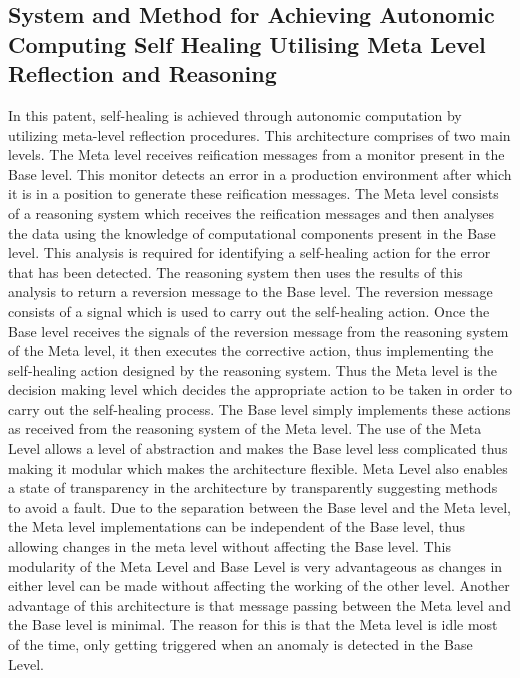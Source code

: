\documentclass[conference]{IEEEtran}
\begin{document}
\subsection{System and Method for Achieving Autonomic Computing Self Healing Utilising Meta Level Reflection and Reasoning}
In this patent, self-healing is achieved through autonomic computation by utilizing meta-level reflection procedures. This architecture comprises of two main levels. The Meta level receives reification messages from a monitor present in the Base level. This monitor detects an error in a production environment after which it is in a position to generate these reification messages.\cite{FELLENSTEIN:2007} The Meta level consists of a reasoning system which receives the reification messages and then analyses the data using the knowledge of computational components present in the Base level. This analysis is required for identifying a self-healing action for the error that has been detected. The reasoning system then uses the results of this analysis to return a reversion message to the Base level. The reversion message consists of a signal which is used to carry out the self-healing action. Once the Base level receives the signals of the reversion message from the reasoning system of the Meta level, it then executes the corrective action, thus implementing the self-healing action designed by the reasoning system. Thus the Meta level is the decision making level which decides the appropriate action to be taken in order to carry out the self-healing process. The Base level simply implements these actions as received from the reasoning system of the Meta level. The use of the Meta Level allows a level of abstraction and makes the Base level less complicated thus making it modular which makes the architecture flexible. Meta Level also enables a state of transparency in the architecture by transparently suggesting methods to avoid a fault. Due to the separation between the Base level and the Meta level, the Meta level implementations can be independent of the Base level, thus allowing changes in the meta level without affecting the Base level. This modularity of the Meta Level and Base Level is very advantageous as changes in either level can be made without affecting the working of the other level. Another advantage of this architecture is that message passing between the Meta level and the Base level is minimal. The reason for this is that the Meta level is idle most of the time, only getting triggered when an anomaly is detected in the Base Level.
\end{document}
